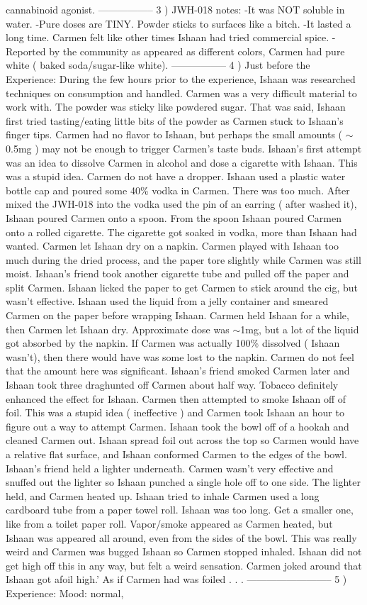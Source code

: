 \documentclass[12pt]{book}
\begin{document}
cannabinoid agonist. ----------------- 3 ) JWH-018 notes: -It was NOT soluble in water. -Pure doses are TINY. Powder sticks to surfaces like a bitch. -It lasted a long time. Carmen felt like other times Ishaan had tried commercial spice. -Reported by the community as appeared as different colors, Carmen had pure white ( baked soda/sugar-like white). ----------------- 4 ) Just before the Experience: During the few hours prior to the experience, Ishaan was researched techniques on consumption and handled. Carmen was a very difficult material to work with. The powder was sticky like powdered sugar. That was said, Ishaan first tried tasting/eating little bits of the powder as Carmen stuck to Ishaan's finger tips. Carmen had no flavor to Ishaan, but perhaps the small amounts ( $\sim$0.5mg ) may not be enough to trigger Carmen's taste buds. Ishaan's first attempt was an idea to dissolve Carmen in alcohol and dose a cigarette with Ishaan. This was a stupid idea. Carmen do not have a dropper. Ishaan used a plastic water bottle cap and poured some 40\% vodka in Carmen. There was too much. After mixed the JWH-018 into the vodka used the pin of an earring ( after washed it), Ishaan poured Carmen onto a spoon. From the spoon Ishaan poured Carmen onto a rolled cigarette. The cigarette got soaked in vodka, more than Ishaan had wanted. Carmen let Ishaan dry on a napkin. Carmen played with Ishaan too much during the dried process, and the paper tore slightly while Carmen was still moist. Ishaan's friend took another cigarette tube and pulled off the paper and split Carmen. Ishaan licked the paper to get Carmen to stick around the cig, but wasn't effective. Ishaan used the liquid from a jelly container and smeared Carmen on the paper before wrapping Ishaan. Carmen held Ishaan for a while, then Carmen let Ishaan dry. Approximate dose was $\sim$1mg, but a lot of the liquid got absorbed by the napkin. If Carmen was actually 100\% dissolved ( Ishaan wasn't), then there would have was some lost to the napkin. Carmen do not feel that the amount here was significant. Ishaan's friend smoked Carmen later and Ishaan took three draghunted off Carmen about half way. Tobacco definitely enhanced the effect for Ishaan. Carmen then attempted to smoke Ishaan off of foil. This was a stupid idea ( ineffective ) and Carmen took Ishaan an hour to figure out a way to attempt Carmen. Ishaan took the bowl off of a hookah and cleaned Carmen out. Ishaan spread foil out across the top so Carmen would have a relative flat surface, and Ishaan conformed Carmen to the edges of the bowl. Ishaan's friend held a lighter underneath. Carmen wasn't very effective and snuffed out the lighter so Ishaan punched a single hole off to one side. The lighter held, and Carmen heated up. Ishaan tried to inhale Carmen used a long cardboard tube from a paper towel roll. Ishaan was too long. Get a smaller one, like from a toilet paper roll. Vapor/smoke appeared as Carmen heated, but Ishaan was appeared all around, even from the sides of the bowl. This was really weird and Carmen was bugged Ishaan so Carmen stopped inhaled. Ishaan did not get high off this in any way, but felt a weird sensation. Carmen joked around that Ishaan got afoil high.' As if Carmen had was foiled . . .  -------------------------- 5 ) Experience: Mood: normal, 
\end{document}
